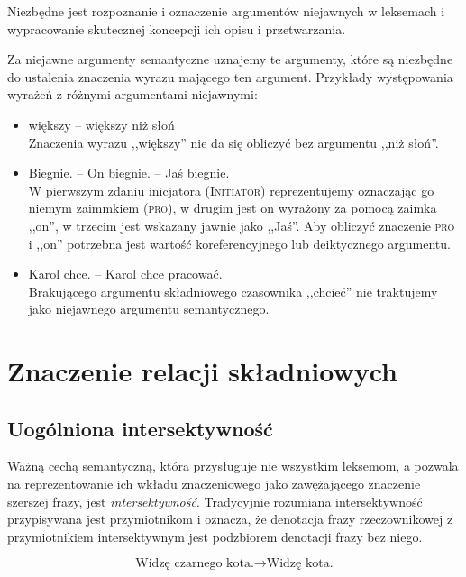 \documentclass[a4paper, 12pt]{article}
\theoremstyle{remark}
\begin{document}
Niezbędne jest rozpoznanie i oznaczenie argumentów niejawnych w leksemach i wypracowanie skutecznej koncepcji ich opisu i przetwarzania.

Za niejawne argumenty semantyczne uznajemy te argumenty, które są niezbędne do ustalenia znaczenia wyrazu mającego ten argument.
Przykłady występowania wyrażeń z różnymi argumentami niejawnymi:
\begin{itemize}
	\item większy -- większy niż słoń \\ Znaczenia wyrazu ,,większy'' nie da się obliczyć bez argumentu ,,niż słoń''.
	\item Biegnie. -- On biegnie. -- Jaś biegnie. \\
	W pierwszym zdaniu inicjatora (\textsc{Initiator}) reprezentujemy oznaczając go niemym zaimmkiem (\textsc{pro}), w drugim jest on wyrażony za pomocą zaimka ,,on'', w trzecim jest wskazany jawnie jako ,,Jaś''.
	Aby obliczyć znaczenie \textsc{pro} i ,,on'' potrzebna jest wartość koreferencyjnego lub deiktycznego argumentu.
	\item Karol chce. -- Karol chce pracować.\\
	Brakującego argumentu składniowego czasownika ,,chcieć'' nie traktujemy jako niejawnego argumentu semantycznego.
\end{itemize}

\section{Znaczenie relacji składniowych} %

\subsection{Uogólniona intersektywność} %
Ważną cechą semantyczną, która przysługuje nie wszystkim leksemom, a pozwala na reprezentowanie ich wkładu znaczeniowego jako zawężającego znaczenie szerszej frazy, jest \emph{intersektywność}.
Tradycyjnie rozumiana intersektywność przypisywana jest przymiotnikom i oznacza, że denotacja frazy rzeczownikowej z przymiotnikiem intersektywnym jest podzbiorem denotacji frazy bez niego.

\begin{equation}
\text{Widzę czarnego kota.} \rightarrow \text{Widzę kota.}
\end{equation}
\end{document}

